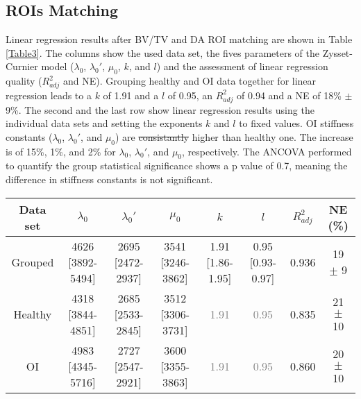 \documentclass[a4paper,fleqn]{DC_ArtStyle}
\providecommand{\DIFadd}[1]{{\protect\color{blue}{#1}}} %
\providecommand{\DIFdel}[1]{{\protect\color{red}\sout{#1}}}                      %
\providecommand{\DIFaddbegin}{} %
\providecommand{\DIFaddend}{} %
\providecommand{\DIFdelbegin}{} %
\providecommand{\DIFdelend}{} %
\providecommand{\DIFaddFL}[1]{\DIFadd{#1}} %
\providecommand{\DIFdelFL}[1]{\DIFdel{#1}} %
\providecommand{\DIFaddbeginFL}{} %
\providecommand{\DIFaddendFL}{} %
\providecommand{\DIFdelbeginFL}{} %
\providecommand{\DIFdelendFL}{} %
\begin{document}
\subsection{ROIs Matching}
Linear regression results after BV/TV and DA ROI matching are shown in Table \ref{Table3}. The columns show the used data set, the fives parameters of the Zysset-Curnier model ($\lambda_0$, $\lambda_0'$, $\mu_0$, $k$, and $l$) and the assessment of linear regression quality ($R^2_{adj}$ and NE). Grouping healthy and OI data together for linear regression leads to a $k$ of 1.91 and a $l$ of 0.95, an $R^2_{adj}$ of 0.94 and a NE of 18\% $\pm$ 9\%. The second and the last row show linear regression results using the individual data sets and setting the exponents $k$ and $l$ to fixed values. OI stiffness constants ($\lambda_0$, $\lambda_0'$, and $\mu_0$) are \DIFdelbegin \DIFdel{consistantly }\DIFdelend \DIFaddbegin \DIFadd{consistently }\DIFaddend higher than healthy one. The increase is of 15\%, 1\%, and 2\% for $\lambda_0$, $\lambda_0'$, and $\mu_0$, respectively. The ANCOVA performed to quantify the group statistical significance shows a p value of 0.7, meaning the difference in stiffness constants is not significant.\\

\begin{table*}[b]
	\caption{Constants obtained with BV/TV and DA matched data sets. Comparison is performed between grouped (N ROIs = 166) and separated data sets (N ROIs = 83). Values are presented as value [95\% CI] or mean $\pm$ standard deviation. Values in \DIFdelbeginFL \DIFdelFL{gray }\DIFdelendFL \DIFaddbeginFL \DIFaddFL{grey }\DIFaddendFL were fixed in the linear regression.}
	\label{Table3}
	\begin{tabular}{cccccccc}
		\toprule
		Data set & $\lambda_0$ & $\lambda_0'$ & $\mu_0$ & $k$ & $l$ & $R^2_{adj}$ & NE (\%) \\
		\midrule
		Grouped & 4626 [3892-5494] & 2695 [2472-2937] & 3541 [3246-3862] & 1.91 [1.86-1.95] & 0.95 [0.93-0.97] & 0.936 & 19 $\pm$ 9\\

		Healthy & 4318 [3844-4851] & 2685 [2533-2845] & 3512 [3306-3731] & \textcolor{gray}{1.91} & \textcolor{gray}{0.95} & 0.835 & 21 $\pm$ 10\\

		OI & 4983 [4345-5716] & 2727 [2547-2921] & 3600 [3355-3863] & \textcolor{gray}{1.91} & \textcolor{gray}{0.95} & 0.860 & 20 $\pm$ 10\\
		\bottomrule
	\end{tabular}
\end{table*}
\end{document}
